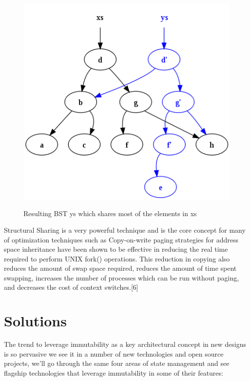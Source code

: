 \documentclass[12pt,twoside]{article}
\begin{document}
\begin{figure}[H]
    \begin{center}
        {\includegraphics[scale=.6]{structuralSharing.png}}
       \end{center}
       \caption{ \label{figure:2} Resulting BST ys which shares most of the elements in xs}
\end{figure}
Structural Sharing is a very powerful technique and is the core concept for many of optimization techniques such as Copy-on-write paging strategies for address space
inheritance have been shown to be effective in reducing the
real time required to perform UNIX fork() operations. This reduction in copying also reduces the amount of
swap space required, reduces the amount of time spent swapping, increases the number of processes which can be run
without paging, and decreases the cost of context switches.[6]


\newpage
\section{Solutions}


The trend to leverage immutability as a key architectural concept in new designs is so pervasive we see it in a number of new technologies and open source projects, we'll go through the same four areas of state management and see flagship technologies that leverage immutability in some of their features:
\end{document}
